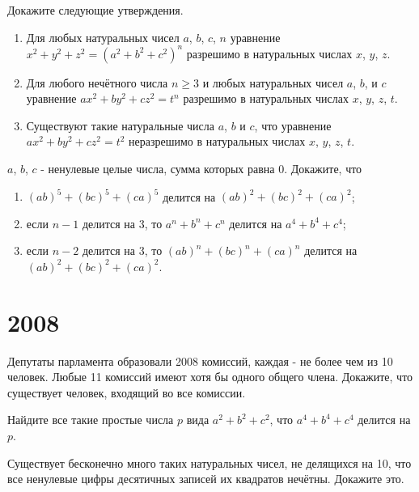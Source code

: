 \documentclass[11pt, a4paper]{problems_template}
\begin{document}
\begin{exercise}[2003]
Докажите следующие утверждения.
\begin{enumerate}
\item Для любых натуральных чисел $a$, $b$, $c$, $n$ уравнение $x^{2} + y^{2} + z^{2} = (a^{2} + b^{2} + c^{2})^{n}$ разрешимо в натуральных числах $x$, $y$, $z$.
\item Для любого нечётного числа $n \geqslant 3$ и любых натуральных чисел $a$, $b$, и $c$ уравнение $ax^{2} + by^{2} + cz^{2} = t^{n}$ разрешимо в натуральных числах $x$, $y$, $z$, $t$.
\item Существуют такие натуральные числа $a$, $b$ и $c$, что уравнение $ax^{2} + by^{2} + cz^{2} = t^{2}$ неразрешимо в натуральных числах $x$, $y$, $z$, $t$.
\end{enumerate}
\end{exercise}

\begin{exercise}[2023]
$a$, $b$, $c$ - ненулевые целые числа, сумма которых равна 0. Докажите, что
\begin{enumerate}
\item $(ab)^{5} + (bc)^{5} + (ca)^{5}$ делится на $(ab)^{2} + (bc)^{2} + (ca)^{2}$;
\item если $n - 1$ делится на 3, то $a^{n} + b^{n} + c^{n}$ делится на $a^{4} + b^{4} + c^{4}$;
\item если $n - 2$ делится на 3, то $(ab)^{n} + (bc)^{n} + (ca)^{n}$ делится на $(ab)^{2} + (bc)^{2} + (ca)^{2}$.
\end{enumerate}
\end{exercise}

\chapter{2008}

\begin{exercise}[2096]
Депутаты парламента образовали 2008 комиссий, каждая - не более чем из 10 человек. Любые 11 комиссий имеют хотя бы одного общего члена. Докажите, что существует человек, входящий во все комиссии.
\end{exercise}

\begin{exercise}[2097]
Найдите все такие простые числа $p$ вида $a^{2} + b^{2} + c^{2}$, что $a^{4} + b^{4} + c^{4}$ делится на $p$.
\end{exercise}

\begin{exercise}[2114]
Существует бесконечно много таких натуральных чисел, не делящихся на 10, что все ненулевые цифры десятичных записей их квадратов нечётны. Докажите это.
\end{exercise}
\end{document}
